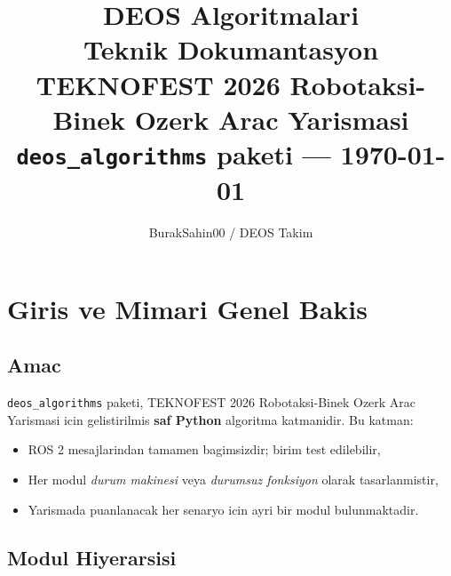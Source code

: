 \documentclass[a4paper,12pt]{article}
\title{
  \vspace{-1cm}
  \textbf{\LARGE DEOS Algoritmalari}\\[0.4em]
  \large Teknik Dokumantasyon\\[0.2em]
  \normalsize TEKNOFEST 2026 Robotaksi-Binek Ozerk Arac Yarismasi\\[0.2em]
  \normalsize \texttt{deos\_algorithms} paketi --- \today
}
\author{BurakSahin00 / DEOS Takim}
\date{}
\begin{document}
\maketitle
\tableofcontents
\newpage

\section{Giris ve Mimari Genel Bakis}

\subsection{Amac}

\texttt{deos\_algorithms} paketi, TEKNOFEST 2026 Robotaksi-Binek Ozerk Arac
Yarismasi icin gelistirilmis \textbf{saf Python} algoritma katmanidir. Bu
katman:

\begin{itemize}
  \item ROS 2 mesajlarindan tamamen bagimsizdir; birim test edilebilir,
  \item Her modul \emph{durum makinesi} veya \emph{durumsuz fonksiyon} olarak
        tasarlanmistir,
  \item Yarismada puanlanacak her senaryo icin ayri bir modul bulunmaktadir.
\end{itemize}

\subsection{Modul Hiyerarsisi}
\end{document}
